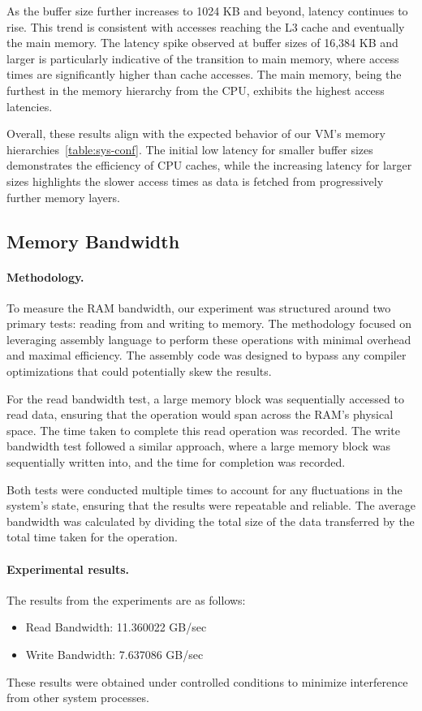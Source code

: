 As the buffer size further increases to 1024 KB and beyond, latency continues to rise. This trend is consistent with accesses reaching the L3 cache and eventually the main memory. The latency spike observed at buffer sizes of 16,384 KB and larger is particularly indicative of the transition to main memory, where access times are significantly higher than cache accesses. The main memory, being the furthest in the memory hierarchy from the CPU, exhibits the highest access latencies.

Overall, these results align with the expected behavior of our VM's memory hierarchies~\ref{table:sys-conf}. The initial low latency for smaller buffer sizes demonstrates the efficiency of CPU caches, while the increasing latency for larger sizes highlights the slower access times as data is fetched from progressively further memory layers.

\subsection{Memory Bandwidth}
\paragraph{Methodology.}
To measure the RAM bandwidth, our experiment was structured around two primary tests: reading from and writing to memory. The methodology focused on leveraging assembly language to perform these operations with minimal overhead and maximal efficiency. The assembly code was designed to bypass any compiler optimizations that could potentially skew the results.

For the read bandwidth test, a large memory block was sequentially accessed to read data, ensuring that the operation would span across the RAM's physical space. The time taken to complete this read operation was recorded. The write bandwidth test followed a similar approach, where a large memory block was sequentially written into, and the time for completion was recorded.

Both tests were conducted multiple times to account for any fluctuations in the system's state, ensuring that the results were repeatable and reliable. The average bandwidth was calculated by dividing the total size of the data transferred by the total time taken for the operation.

\paragraph{Experimental results.}
The results from the experiments are as follows:
\begin{itemize}[leftmargin=*]
	\item Read Bandwidth: 11.360022 GB/sec
	\item Write Bandwidth: 7.637086 GB/sec
\end{itemize}
These results were obtained under controlled conditions to minimize interference from other system processes.

